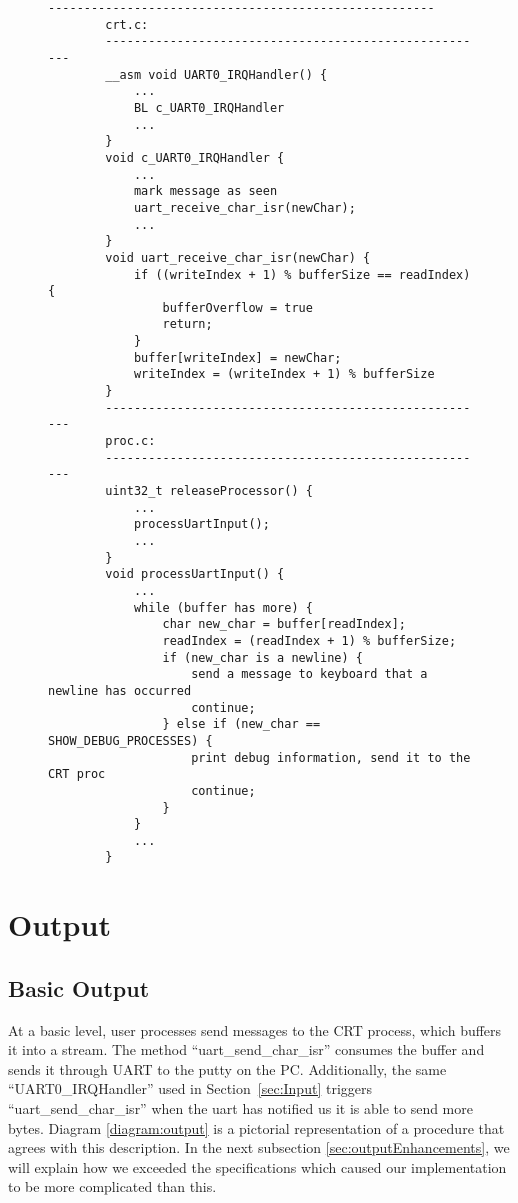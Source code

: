 \documentclass[12pt]{report}
\begin{document}
    \begin{figure}
        \centering
        \begin{lstlisting}[label=code:uart_input,caption={Input Pseudocode}]
        ------------------------------------------------------
        crt.c:
        ------------------------------------------------------
        __asm void UART0_IRQHandler() {
            ...
            BL c_UART0_IRQHandler
            ...
        }
        void c_UART0_IRQHandler {
            ...
            mark message as seen
            uart_receive_char_isr(newChar);
            ...
        }
        void uart_receive_char_isr(newChar) {
            if ((writeIndex + 1) % bufferSize == readIndex) {
                bufferOverflow = true
                return;
            }
            buffer[writeIndex] = newChar;
            writeIndex = (writeIndex + 1) % bufferSize
        }
        ------------------------------------------------------
        proc.c:
        ------------------------------------------------------
        uint32_t releaseProcessor() {
            ...
            processUartInput();
            ...
        }
        void processUartInput() {
            ...
            while (buffer has more) {
                char new_char = buffer[readIndex];
                readIndex = (readIndex + 1) % bufferSize;
                if (new_char is a newline) {
                    send a message to keyboard that a newline has occurred
                    continue;
                } else if (new_char == SHOW_DEBUG_PROCESSES) {
                    print debug information, send it to the CRT proc
                    continue;
                }
            }
            ...
        }
        \end{lstlisting}
    \end{figure}
\section{Output}
\subsection{Basic Output}
    At a basic level, user processes send messages to the CRT process, which
    buffers it into a stream. The method ``uart\_send\_char\_isr'' consumes the
    buffer and sends it through UART to the putty on the PC. Additionally, the
    same ``UART0\_IRQHandler'' used in Section~\ref{sec:Input} triggers ``uart\_send\_char\_isr''
    when the uart has notified us it is able to send more bytes. Diagram \ref{diagram:output} is a pictorial representation of a
    procedure that agrees with this description. In the next subsection
    \ref{sec:outputEnhancements}, we will explain how we exceeded the
    specifications which caused our implementation to be more complicated than
    this.
\end{document}
